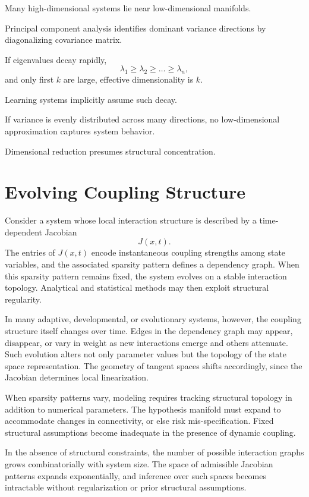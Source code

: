 \documentclass[12pt]{book}
\begin{document}
Many high-dimensional systems lie near low-dimensional manifolds.

Principal component analysis identifies dominant variance directions by diagonalizing covariance matrix.

If eigenvalues decay rapidly,
\[
\lambda_1 \ge \lambda_2 \ge \dots \ge \lambda_n,
\]
and only first $k$ are large, effective dimensionality is $k$.

Learning systems implicitly assume such decay.

If variance is evenly distributed across many directions, no low-dimensional approximation captures system behavior.

Dimensional reduction presumes structural concentration.

\section{Evolving Coupling Structure}

Consider a system whose local interaction structure is described by a time-dependent Jacobian
\[
J(x,t).
\]
The entries of $J(x,t)$ encode instantaneous coupling strengths among state variables, and the associated sparsity pattern defines a dependency graph. When this sparsity pattern remains fixed, the system evolves on a stable interaction topology. Analytical and statistical methods may then exploit structural regularity.

In many adaptive, developmental, or evolutionary systems, however, the coupling structure itself changes over time. Edges in the dependency graph may appear, disappear, or vary in weight as new interactions emerge and others attenuate. Such evolution alters not only parameter values but the topology of the state space representation. The geometry of tangent spaces shifts accordingly, since the Jacobian determines local linearization.

When sparsity patterns vary, modeling requires tracking structural topology in addition to numerical parameters. The hypothesis manifold must expand to accommodate changes in connectivity, or else risk mis-specification. Fixed structural assumptions become inadequate in the presence of dynamic coupling.

In the absence of structural constraints, the number of possible interaction graphs grows combinatorially with system size. The space of admissible Jacobian patterns expands exponentially, and inference over such spaces becomes intractable without regularization or prior structural assumptions.
\end{document}
